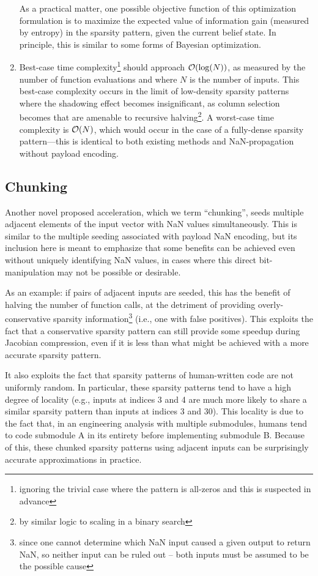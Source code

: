 \begin{enumerate}
    As a practical matter, one possible objective function of this optimization formulation is to maximize the expected value of information gain (measured by entropy) in the sparsity pattern, given the current belief state. In principle, this is similar to some forms of Bayesian optimization.

    \item Best-case time complexity\footnote{ignoring the trivial case where the pattern is all-zeros and this is suspected in advance} should approach $\mathcal{O}(\log(N))$, as measured by the number of function evaluations and where $N$ is the number of inputs. This best-case complexity occurs in the limit of low-density sparsity patterns where the shadowing effect becomes insignificant, as column selection becomes  that are amenable to recursive halving\footnote{by similar logic to scaling in a binary search}. A worst-case time complexity is $\mathcal{O}(N)$, which would occur in the case of a fully-dense sparsity pattern—this is identical to both existing methods and NaN-propagation without payload encoding.
\end{enumerate}

\subsection{Chunking}

Another novel proposed acceleration, which we term ``chunking'', seeds multiple adjacent elements of the input vector with NaN values simultaneously. This is similar to the multiple seeding associated with payload NaN encoding, but its inclusion here is meant to emphasize that some benefits can be achieved even without uniquely identifying NaN values, in cases where this direct bit-manipulation may not be possible or desirable.

As an example: if pairs of adjacent inputs are seeded, this has the benefit of halving the number of function calls, at the detriment of providing overly-conservative sparsity information\footnote{since one cannot determine which NaN input caused a given output to return NaN, so neither input can be ruled out -- both inputs must be assumed to be the possible cause} (i.e., one with false positives). This exploits the fact that a conservative sparsity pattern can still provide some speedup during Jacobian compression, even if it is less than what might be achieved with a more accurate sparsity pattern.

It also exploits the fact that sparsity patterns of human-written code are not uniformly random. In particular, these sparsity patterns tend to have a high degree of locality (e.g., inputs at indices 3 and 4 are much more likely to share a similar sparsity pattern than inputs at indices 3 and 30). This locality is due to the fact that, in an engineering analysis with multiple submodules, humans tend to code submodule A in its entirety before implementing submodule B. Because of this, these chunked sparsity patterns using adjacent inputs can be surprisingly accurate approximations in practice.

